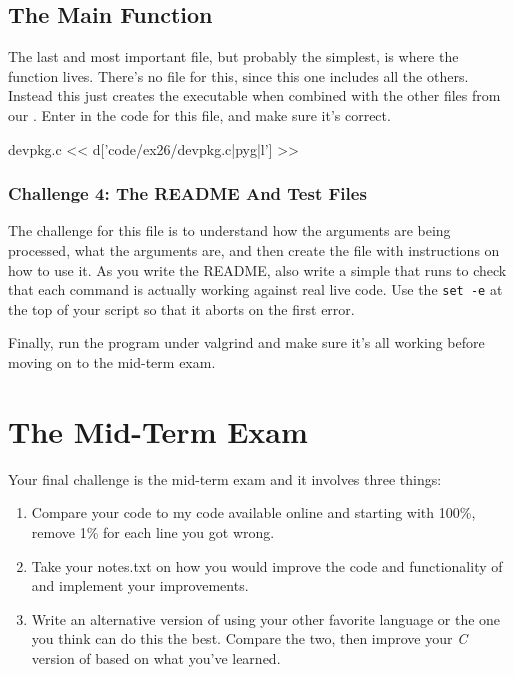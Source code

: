 \subsection{The  Main Function}

The last and most important file, but probably the simplest, is 
where the  function lives.  There's no  file for this, since
this one includes all the others.  Instead this just creates the executable
 when combined with the other  files from our 
.  Enter in the code for this file, and make sure it's 
correct.

\begin{code}{devpkg.c}
<< d['code/ex26/devpkg.c|pyg|l'] >>
\end{code}

\subsubsection{Challenge 4: The README And Test Files}

The challenge for this file is to understand how the arguments are
being processed, what the arguments are, and then create the 
file with instructions on how to use it.  As you write the README, also
write a simple  that runs  to check that
each command is actually working against real live code.  Use the \verb|set -e|
at the top of your script so that it aborts on the first error.

Finally, run the program under valgrind and make sure it's all working
before moving on to the mid-term exam.

\section{The Mid-Term Exam}

Your final challenge is the mid-term exam and it involves three things:

\begin{enumerate}
\item Compare your code to my code available online and starting with 100\%, 
    remove 1\% for each line you got wrong.
\item Take your notes.txt on how you would improve the code and functionality
    of  and implement your improvements.
\item Write an alternative version of  using your other 
    favorite language or the one you think can do this the best.  Compare
    the two, then improve your \emph{C} version of  based on what
    you've learned.
\end{enumerate}

